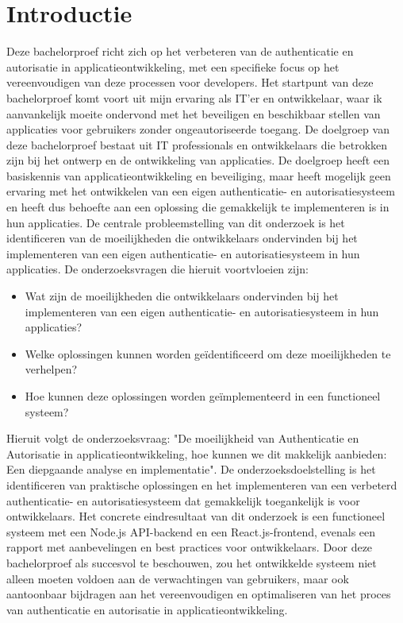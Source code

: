 

\section{Introductie}%
\label{sec:introductie}

Deze bachelorproef richt zich op het verbeteren van de authenticatie en autorisatie in applicatieontwikkeling, met een specifieke focus op het 
vereenvoudigen van deze processen voor developers. Het startpunt van deze bachelorproef komt voort uit mijn ervaring als IT'er en ontwikkelaar, 
waar ik aanvankelijk moeite ondervond met het beveiligen en beschikbaar stellen van applicaties voor gebruikers zonder ongeautoriseerde toegang.
\newline
\newline
De doelgroep van deze bachelorproef bestaat uit IT professionals en ontwikkelaars die betrokken zijn bij het ontwerp en de ontwikkeling van
applicaties. De doelgroep heeft een basiskennis van applicatieontwikkeling en beveiliging, maar heeft mogelijk geen ervaring met het ontwikkelen
van een eigen authenticatie- en autorisatiesysteem en heeft dus behoefte aan een oplossing die gemakkelijk te implementeren is in hun applicaties.
\newline
\newline
De centrale probleemstelling van dit onderzoek is het identificeren van de moeilijkheden die ontwikkelaars ondervinden bij het implementeren van
een eigen authenticatie- en autorisatiesysteem in hun applicaties. De onderzoeksvragen die hieruit voortvloeien zijn:
\begin{itemize}
  \item Wat zijn de moeilijkheden die ontwikkelaars ondervinden bij het implementeren van een eigen authenticatie- en autorisatiesysteem in hun applicaties?
  \item Welke oplossingen kunnen worden geïdentificeerd om deze moeilijkheden te verhelpen?
  \item Hoe kunnen deze oplossingen worden geïmplementeerd in een functioneel systeem?
\end{itemize}
Hieruit volgt de onderzoeksvraag: "De moeilijkheid van Authenticatie en Autorisatie in applicatieontwikkeling, hoe kunnen we dit makkelijk aanbieden: 
Een diepgaande analyse en implementatie".
\newline
\newline
De onderzoeksdoelstelling is het identificeren van praktische oplossingen en het implementeren van een verbeterd authenticatie- en autorisatiesysteem 
dat gemakkelijk toegankelijk is voor ontwikkelaars. Het concrete eindresultaat van dit onderzoek is een functioneel systeem met een Node.js API-backend 
en een React.js-frontend, evenals een rapport met aanbevelingen en best practices voor ontwikkelaars.
\newline
\newline
Door deze bachelorproef als succesvol te beschouwen, zou het ontwikkelde systeem niet alleen moeten voldoen aan de verwachtingen van gebruikers, 
maar ook aantoonbaar bijdragen aan het vereenvoudigen en optimaliseren van het proces van authenticatie en autorisatie in applicatieontwikkeling.

